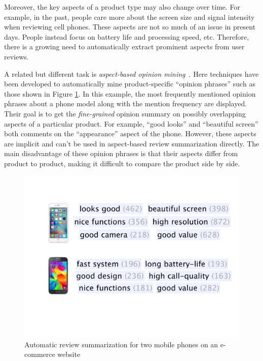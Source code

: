 \documentclass[11pt,a4paper]{article}
\newcommand{\figref}[1]{Figure \ref{#1}}
\begin{document}
Moreover, the key aspects of a product type may also change over time. 
For example, in the past, people care more about the screen 
size and signal intensity when reviewing cell phones. 
These aspects are not so much of an issue in present days. 
People instead focus on battery life and processing speed, etc.
Therefore, there is a growing need to automatically extract prominent 
aspects from user reviews.

A related but different task is \textit{aspect-based opinion 
	mining}~\cite{su2008hidden,zeng2013classification}. 
Here techniques have been developed to automatically mine
product-specific ``opinion phrases'' such as those shown in 
\figref{fig:phrases}.
In this example, the most frequently mentioned opinion phrases
about a phone model along with the mention frequency
are displayed. 
Their goal is to get the {\em fine-grained} opinion summary on
possibly overlapping aspects of a particular product.
For example, ``good looks'' and ``beautiful screen'' both comments
on the ``appearance'' aspect of the phone. However, these aspects
are implicit and can't be used in aspect-based review summarization
directly. The main disadvantage of these opinion phrases is that
their aspects differ from product to product, making it difficult to
compare the product side by side. 

\begin{figure}[th]
	\centering
	\includegraphics[width=0.75\columnwidth]{figures/phrases}
	\caption{Automatic review summarization for two mobile phones 
		on an e-commerce website}
	\label{fig:phrases}
\end{figure}
\end{document}
